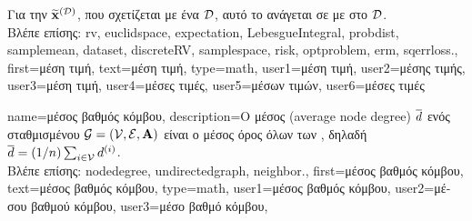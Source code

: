 {{		\foreignlanguage{greek}{Για την}  $\widetilde{{\bf x}}^{(\mathcal{D})}$, \foreignlanguage{greek}{που σχετίζεται με ένα}
		 $\mathcal{D}$, \foreignlanguage{greek}{αυτό το}  \foreignlanguage{greek}{ανάγεται σε} 
		 \foreignlanguage{greek}{με}  \foreignlanguage{greek}{στο} $\mathcal{D}$.
		\\
		\foreignlanguage{greek}{Βλέπε επίσης:} \gls{rv}, \gls{euclidspace}, \gls{expectation}, \gls{LebesgueIntegral}, \gls{probdist}, 
		\gls{samplemean}, \gls{dataset}, \gls{discreteRV}, \gls{samplespace}, \gls{risk}, \gls{optproblem}, \gls{erm}, \gls{sqerrloss}.}, 
	first={\foreignlanguage{greek}{μέση τιμή}}, 
	text={\foreignlanguage{greek}{μέση τιμή}},
	type=math,
	user1={\foreignlanguage{greek}{μέση τιμή}}, %
   	user2={\foreignlanguage{greek}{μέσης τιμής}}, %
	user3={\foreignlanguage{greek}{μέση τιμή}}, %
	user4={\foreignlanguage{greek}{μέσες τιμές}}, %
   	user5={\foreignlanguage{greek}{μέσων τιμών}}, %
	user6={\foreignlanguage{greek}{μέσες τιμές}} %
}

{name={\foreignlanguage{greek}{μέσος βαθμός κόμβου}},
	description={\foreignlanguage{greek}{Ο μέσος}  
		(average node degree) $\overline{d}$ \foreignlanguage{greek}{ενός σταθμισμένου}  
		$\mathcal{G}=(\mathcal{V},\mathcal{E},{\bf A})$ \foreignlanguage{greek}{είναι ο μέσος όρος όλων των} , 
		\foreignlanguage{greek}{δηλαδή} $\overline{d} = (1/n) \sum_{i \in \mathcal{V}} d^{(i)}$.
					\\ 
		\foreignlanguage{greek}{Βλέπε επίσης:} \gls{nodedegree}, \gls{undirectedgraph}, \gls{neighbor}.},
	first={\foreignlanguage{greek}{μέσος βαθμός κόμβου}},
	text={\foreignlanguage{greek}{μέσος βαθμός κόμβου}},
	type=math,
	user1={\foreignlanguage{greek}{μέσος βαθμός κόμβου}}, %
  	user2={\foreignlanguage{greek}{μέσου βαθμού κόμβου}}, %
	user3={\foreignlanguage{greek}{μέσο βαθμό κόμβου}}, %
}

